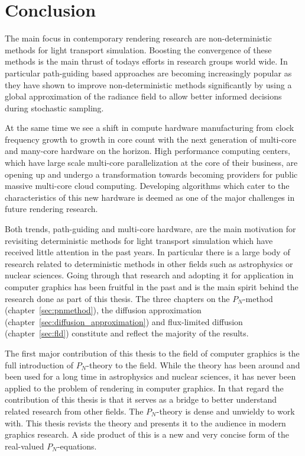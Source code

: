 \chapter{Conclusion}
%
\label{sec:conclusion}

The main focus in contemporary rendering research are non-deterministic methods for light transport simulation. Boosting the convergence of these methods is the main thrust of todays efforts in research groups world wide. In particular path-guiding based approaches are becoming increasingly popular as they have shown to improve non-deterministic methods significantly by using a global approximation of the radiance field to allow better informed decisions during stochastic sampling.

At the same time we see a shift in compute hardware manufacturing from clock frequency growth to growth in core count with the next generation of multi-core and many-core hardware on the horizon. High performance computing centers, which have large scale multi-core parallelization at the core of their business, are opening up and undergo a transformation towards becoming providers for public massive multi-core cloud computing. Developing algorithms which cater to the characteristics of this new hardware is deemed as one of the major challenges in future rendering research.

Both trends, path-guiding and multi-core hardware, are the main motivation for revisiting deterministic methods for light transport simulation which have received little attention in the past years. In particular there is a large body of research related to deterministic methods in other fields such as astrophysics or nuclear sciences. Going through that research and adopting it for application in computer graphics has been fruitful in the past and is the main spirit behind the research done as part of this thesis. The three chapters on the $P_N$-method (chapter~\ref{sec:pnmethod}), the diffusion approximation (chapter~\ref{sec:diffusion_approximation}) and flux-limited diffusion (chapter~\ref{sec:fld}) constitute and reflect the majority of the results.

The first major contribution of this thesis to the field of computer graphics is the full introduction of $P_N$-theory to the field. While the theory has been around and been used for a long time in astrophysics and nuclear sciences, it has never been applied to the problem of rendering in computer graphics. In that regard the contribution of this thesis is that it serves as a bridge to better understand related research from other fields. The $P_N$-theory is dense and unwieldy to work with. This thesis revists the theory and presents it to the audience in modern graphics research. A side product of this is a new and very concise form of the real-valued $P_N$-equations.

